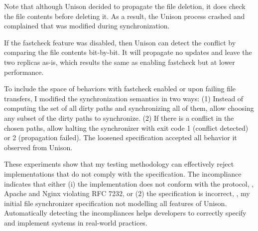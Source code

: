 Note that although Unison decided to propagate the file deletion, it does
check the file contents before deleting it.  As a result, the Unison process
crashed and complained that  was modified during synchronization.

If the fastcheck feature was disabled, then Unison can detect the conflict by
comparing the file contents bit-by-bit.  It will propagate no updates and leave
the two replicas as-is, which results the same as enabling fastcheck but at
lower performance.

To include the space of behaviors with fastcheck enabled or upon failing file
transfers, I modified the synchronization semantics in two ways: (1) Instead of
computing the set of all dirty paths and synchronizing all of them, allow
choosing any subset of the dirty paths to synchronize.  (2) If there is a
conflict in the chosen paths, allow halting the synchronizer with exit code 1
(conflict detected) or 2 (propagation failed).  The loosened specification
accepted all behavior it observed from Unison.

These experiments show that my testing methodology can effectively reject
implementations that do not comply with the specification.  The incompliance
indicates that either (i) the implementation does not conform with the protocol,
\eg, Apache and Nginx violating RFC 7232, or (2) the specification is
incorrect, \eg, my initial file synchronizer specification not modelling all
features of Unison.  Automatically detecting the incompliances helps developers
to correctly specify and implement systems in real-world practices.


